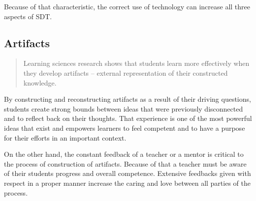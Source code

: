 Because of that characteristic, the correct use of technology can increase all
three aspects of SDT.

\subsection{Artifacts}

\begin{quote}
Learning sciences research shows that students learn more effectively when they
develop artifacts -- external representation of their constructed knowledge.
\cite{education:joseph_phyllis__pbl}
\end{quote}

By constructing and reconstructing artifacts as a result of their driving
questions, students create strong bounds between ideas that were previously
disconnected and to reflect back on their thoughts. That experience is one of
the most powerful ideas that exist \cite{education:papert_mindstorms} and
empowers learners to feel competent and to have a purpose for their efforts in
an important context.

On the other hand, the constant feedback of a teacher or a mentor is critical to
the process of construction of artifacts. Because of that a teacher must be
aware of their students progress and overall competence. Extensive feedbacks given with
respect in a proper manner increase the caring and love between all parties of
the process.

